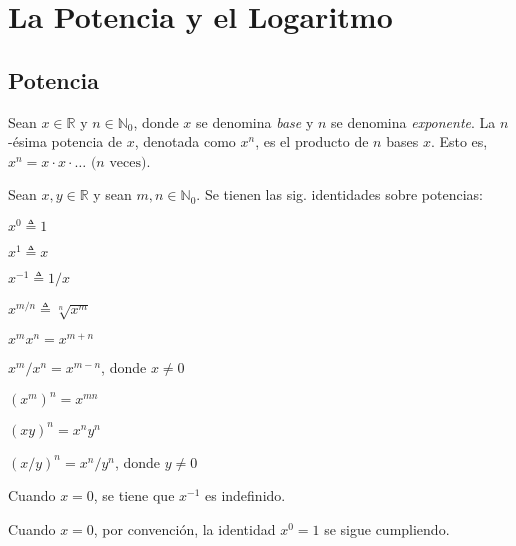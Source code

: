 \chapter{La Potencia y el Logaritmo}

\section{Potencia}

Sean $x\in\mathbb{R}$ y $n\in\mathbb{N}_{0}$, donde $x$ se denomina
\emph{base} y $n$ se denomina \emph{exponente}. La $n$-ésima potencia\emph{
}de $x$, denotada como $x^{n}$, es el producto de $n$ bases $x$.
Esto es, $x^{n}=x\cdot x\cdot\dots\text{ (}n\text{ veces)}$.

\begin{thm}
    \label{laws-of-exp}Sean $x,y\in\mathbb{R}$ y sean $m,n\in\mathbb{N}_{0}$.
    Se tienen las sig. identidades sobre potencias:
    \begin{enumerate}
    \begin{multicols}{2}
        \item $x^{0}\triangleq1$
        \item $x^{1}\triangleq x$
        \item $x^{-1}\triangleq1/x$
        \item $x^{m/n}\triangleq\sqrt[n]{x^{m}}$
        \item $x^{m}x^{n}=x^{m+n}$
        \item $x^{m}/x^{n}=x^{m-n}$, donde $x\neq0$
        \item $(x^{m})^{n}=x^{mn}$
        \item $(xy)^{n}=x^{n}y^{n}$
        \item $(x/y)^{n}=x^{n}/y^{n}$, donde $y\neq0$
    \end{multicols}
    \end{enumerate}
\end{thm}

\begin{rem}
    Cuando $x=0$, se tiene que $x^{-1}$ es indefinido.
\end{rem}


\begin{rem}
    Cuando $x=0$, por convención, la identidad $x^{0}=1$ se sigue
    cumpliendo.
\end{rem}

